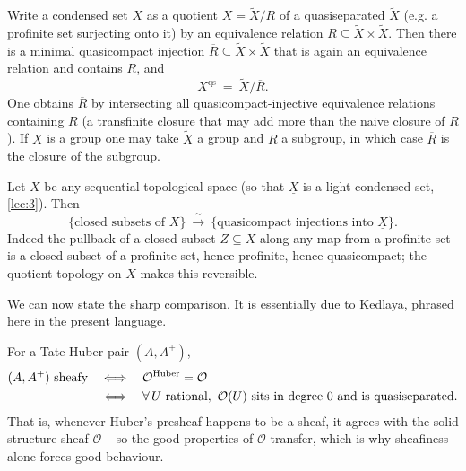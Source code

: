 \begin{lemma}
\label{lem:10:qs-equiv}
Write a condensed set $X$ as a quotient $X=\widetilde X/R$ of a quasiseparated
$\widetilde X$ (e.g. a profinite set surjecting onto it) by an equivalence
relation $R\subseteq\widetilde X\times\widetilde X$. Then there is a minimal
quasicompact injection $\overline R\subseteq\widetilde X\times\widetilde X$ that
is again an equivalence relation and contains $R$, and
\begin{equation*}
X^{\mathrm{qs}}\ =\ \widetilde X/\overline R .
\end{equation*}
One obtains $\overline R$ by intersecting all quasicompact-injective equivalence
relations containing $R$ (a transfinite closure that may add more than the naive
closure of $R$). If $X$ is a group one may take $\widetilde X$ a group and $R$ a
subgroup, in which case $\overline R$ is the closure of the subgroup.
\end{lemma}

\begin{lemma}
\label{lem:10:closed-subsets}
Let $X$ be any sequential topological space (so that $\underline X$ is a light
condensed set, \cref{lec:3}). Then
\begin{equation*}
\{\text{closed subsets of }X\}\ \xrightarrow{\ \sim\ }\
\{\text{quasicompact injections into }\underline X\}.
\end{equation*}
Indeed the pullback of a closed subset $Z\subseteq X$ along any map from a
profinite set is a closed subset of a profinite set, hence profinite, hence
quasicompact; the quotient topology on $X$ makes this reversible.
\end{lemma}

We can now state the sharp comparison. It is essentially due to Kedlaya, phrased
here in the present language.

\begin{theorem}[Sheafy $\Leftrightarrow$ Huber $=$ solid]
\label{thm:10:sheafy-iff}
For a Tate Huber pair $(A,A^{+})$,
\begin{equation*}
\begin{aligned}
(A,A^{+})\ \text{sheafy}&\quad\Longleftrightarrow\quad \mathcal{O}^{\mathrm{Huber}}=\mathcal O\\
&\quad\Longleftrightarrow\quad
\forall\,U\ \text{rational},\ \mathcal O(U)\ \text{sits in degree }0
\ \text{and is quasiseparated}.
\end{aligned}
\end{equation*}
That is, whenever Huber's presheaf happens to be a sheaf, it agrees with the solid
structure sheaf $\mathcal O$ -- so the good properties of $\mathcal O$ transfer,
which is why sheafiness alone forces good behaviour.
\end{theorem}

